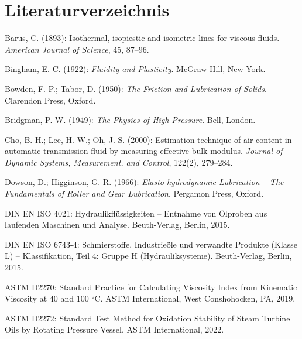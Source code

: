 ﻿\documentclass[a4paper,12pt]{scrreprt}
\theoremstyle{definition}
\begin{document}
\section*{Literaturverzeichnis}

\begin{enumerate}[label={[\arabic*]}]

  \item Barus, C. (1893): Isothermal, isopiestic and isometric lines for
    viscous fluids. \textit{American Journal of Science}, 45, 87--96.

  \item Bingham, E. C. (1922): \textit{Fluidity and Plasticity}.
    McGraw-Hill, New York.

  \item Bowden, F. P.; Tabor, D. (1950): \textit{The Friction and
    Lubrication of Solids}. Clarendon Press, Oxford.

  \item Bridgman, P. W. (1949): \textit{The Physics of High Pressure}.
    Bell, London.

  \item Cho, B. H.; Lee, H. W.; Oh, J. S. (2000): Estimation
    technique of air content in automatic transmission fluid by
    measuring effective bulk modulus. \textit{Journal of Dynamic
    Systems, Measurement, and Control}, 122(2), 279--284.

  \item Dowson, D.; Higginson, G. R. (1966): \textit{Elasto-hydrodynamic
    Lubrication -- The Fundamentals of Roller and Gear Lubrication}.
    Pergamon Press, Oxford.

  \item DIN EN ISO 4021: Hydraulikflüssigkeiten -- Entnahme von
    Ölproben aus laufenden Maschinen und Analyse.
    Beuth-Verlag, Berlin, 2015.

  \item DIN EN ISO 6743-4: Schmierstoffe, Industrieöle und
    verwandte Produkte (Klasse L) -- Klassifikation, Teil 4:
    Gruppe H (Hydrauliksysteme). Beuth-Verlag, Berlin, 2015.

  \item ASTM D2270: Standard Practice for Calculating Viscosity
    Index from Kinematic Viscosity at 40 and 100 °C.
    ASTM International, West Conshohocken, PA, 2019.

  \item ASTM D2272: Standard Test Method for Oxidation Stability
    of Steam Turbine Oils by Rotating Pressure Vessel.
    ASTM International, 2022.


\end{enumerate}
\end{document}
